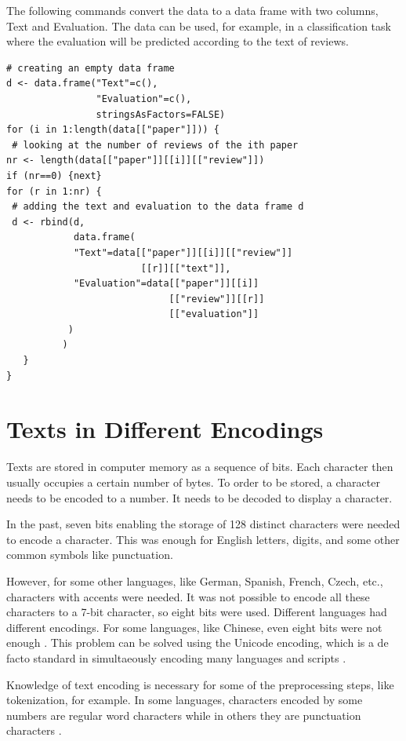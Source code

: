The following commands convert the data to a data frame with two columns,
Text and Evaluation. The data can be used, for example, in a classification
task where the evaluation will be predicted according to the text of reviews.

\begin{verbatim}
# creating an empty data frame
d <- data.frame("Text"=c(),
                "Evaluation"=c(),
                stringsAsFactors=FALSE)
for (i in 1:length(data[["paper"]])) {
 # looking at the number of reviews of the ith paper
nr <- length(data[["paper"]][[i]][["review"]])
if (nr==0) {next}
for (r in 1:nr) {
 # adding the text and evaluation to the data frame d
 d <- rbind(d,
            data.frame(
            "Text"=data[["paper"]][[i]][["review"]]
                        [[r]][["text"]],
            "Evaluation"=data[["paper"]][[i]]
                             [["review"]][[r]]
                             [["evaluation"]]
           )
          )
   }
}

\end{verbatim}  

\section{Texts in Different Encodings}

Texts are stored in computer memory as a sequence of bits. Each character then
usually occupies a certain number of bytes. To order to be stored, a character
needs to be encoded to a number. It needs to be decoded to display a character.

In the past, seven bits enabling the storage of 128 distinct characters were
needed to encode a character. This was enough for English letters, digits, and
some other common symbols like punctuation.

However, for some other languages, like German, Spanish, French, Czech,
etc., characters with accents were needed. It was not possible to encode all these
characters to a 7-bit character, so eight bits were used. Different languages had
different encodings. For some languages, like Chinese, even eight bits were not
enough \cite{ref210}. This problem can be solved using the Unicode encoding, which is
a de facto standard in simultaeously encoding many languages and scripts \cite{ref109}.

Knowledge of text encoding is necessary for some of the preprocessing steps,
like tokenization, for example. In some languages, characters encoded by some
numbers are regular word characters while in others they are punctuation characters \cite{ref210}.

